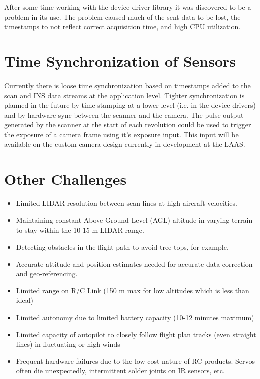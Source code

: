 \documentclass[a4paper,11pt]{report}
\begin{document}
After some time working with the device driver library it was discovered to be a problem in its use. The problem caused much of the sent data to be lost, the timestamps to not reflect correct acquisition time, and high CPU utilization. 

\section{Time Synchronization of Sensors}
 
Currently there is loose time synchronization based on timestamps added to the scan and INS data streams at the application level. Tighter synchronization is planned in the future by time stamping at a lower level (i.e. in the device drivers) and by hardware sync between the scanner and the camera. The pulse output generated by the scanner at the start of each revolution could be used to trigger the exposure of a camera frame using it's exposure input. This input will be available on the custom camera design currently in development at the LAAS.

\section{Other Challenges}

\begin{itemize}
 \item Limited LIDAR resolution between scan lines at high aircraft velocities.
 \item Maintaining constant Above-Ground-Level (AGL) altitude in varying terrain to stay within the 10-15 m LIDAR range.
 \item Detecting obstacles in the flight path to avoid tree tops, for example.
 \item Accurate attitude and position estimates needed for accurate data correction and geo-referencing.
 \item Limited range on R/C Link (150 m max for low altitudes which is less than ideal)
 \item Limited autonomy due to limited battery capacity (10-12 minutes maximum)
 \item Limited capacity of autopilot to closely follow flight plan tracks (even straight lines) in fluctuating or high winds
 \item Frequent hardware failures due to the low-cost nature of RC products. Servos often die unexpectedly, intermittent solder joints on IR sensors, etc.
\end{itemize}
\end{document}
